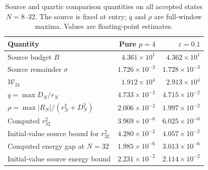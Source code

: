 \begin{table}[!htbp]
\centering
\small
\caption{Source and quartic comparison quantities on all accepted states \(N=8\)--32. The source is fixed at entry; \(q\) and \(\rho\) are full-window maxima. Values are floating-point estimates.}
\label{tab:merged-trajectory-conditions}
\begin{tabularx}{\linewidth}{@{}Xrr@{}}
\toprule
Quantity & Pure \(p=4\) & \(\varepsilon=0.1\) \\
\midrule
Source budget \(B\) & \(4.361\times10^{1}\) & \(4.362\times10^{1}\) \\
Source remainder \(\sigma\) & \(1.726\times10^{-3}\) & \(1.728\times10^{-3}\) \\
\(\mathcal W_{24}\) & \(1.912\times10^{4}\) & \(2.913\times10^{4}\) \\
\(q=\max D_N/r_N\) & \(4.733\times10^{-2}\) & \(4.715\times10^{-2}\) \\
\(\rho=\max |R_N|/(r_N^2+D_N^2)\) & \(2.006\times10^{-2}\) & \(1.997\times10^{-2}\) \\
Computed \(r_{32}^2\) & \(3.969\times10^{-6}\) & \(6.025\times10^{-6}\) \\
Initial-value source bound for \(r_{32}^2\) & \(4.280\times10^{-2}\) & \(4.057\times10^{-2}\) \\
Computed energy gap at \(N=32\) & \(1.985\times10^{-6}\) & \(3.013\times10^{-6}\) \\
Initial-value source energy bound & \(2.231\times10^{-2}\) & \(2.114\times10^{-2}\) \\
\bottomrule
\end{tabularx}
\end{table}
